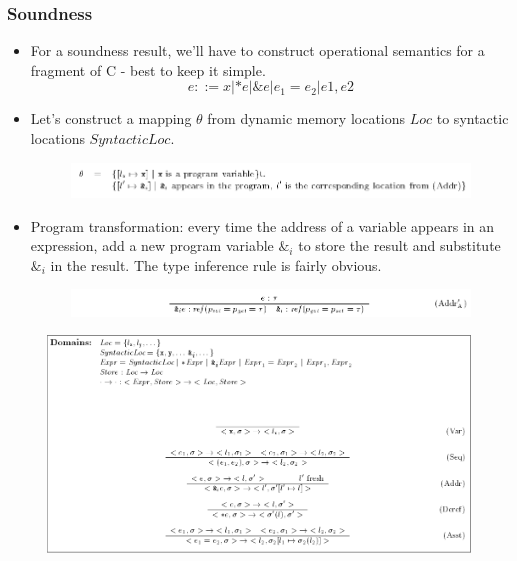 \documentclass{beamer}
\begin{document}
\begin{frame}[allowframebreaks]
  \frametitle{Soundness}

  \begin{itemize}
  \item For a soundness result, we'll have to construct operational
    semantics for a fragment of C - best to keep it simple.
    $$ e ::= x | *e | \& e | e_1 = e_2 | e1,e2 $$
  \item Let's construct a mapping $\theta$ from dynamic memory
    locations $Loc$ to syntactic locations $SyntacticLoc$.
    \begin{figure}
      \centering
      \includegraphics[scale=0.3]{theta.png}
    \end{figure}
  \item Program transformation: every time the address of a variable
    appears in an expression, add a new program variable $\&_i$ to
    store the result and substitute $\&_i$ in the result. The type
    inference rule is fairly obvious.
    \begin{figure}
      \centering
      \includegraphics[scale=0.3]{theta_inference_rule.png}
    \end{figure}
  \end{itemize}

  \framebreak

  \begin{figure}
    \centering
    \includegraphics[scale=0.3]{operational_semantics.png}
  \end{figure}


\end{frame}
\end{document}
